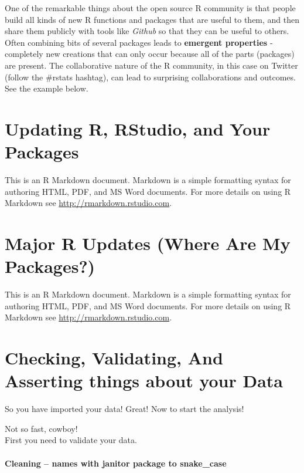 \documentclass[
]{book}
\begin{document}
One of the remarkable things about the open source R community is that people build all kinds of new R functions and packages that are useful to them, and then share them publicly with tools like \emph{Github} so that they can be useful to others. Often combining bits of several packages leads to \textbf{emergent properties} - completely new creations that can only occur because all of the parts (packages) are present. The collaborative nature of the R community, in this case on Twitter (follow the \#rstats hashtag), can lead to surprising collaborations and outcomes.\\
See the example below.\\

\hypertarget{updating-r-rstudio-and-your-packages}{%
\chapter{Updating R, RStudio, and Your Packages}\label{updating-r-rstudio-and-your-packages}}

This is an R Markdown document. Markdown is a simple formatting syntax for authoring HTML, PDF, and MS Word documents. For more details on using R Markdown see \url{http://rmarkdown.rstudio.com}.

\hypertarget{major-r-updates-where-are-my-packages}{%
\chapter{Major R Updates (Where Are My Packages?)}\label{major-r-updates-where-are-my-packages}}

This is an R Markdown document. Markdown is a simple formatting syntax for authoring HTML, PDF, and MS Word documents. For more details on using R Markdown see \url{http://rmarkdown.rstudio.com}.

\hypertarget{checking-validating-and-asserting-things-about-your-data}{%
\chapter{Checking, Validating, And Asserting things about your Data}\label{checking-validating-and-asserting-things-about-your-data}}

So you have imported your data!
Great!
Now to start the analysis!

Not so fast, cowboy!\\
First you need to validate your data.

\hypertarget{cleaning-names-with-janitor-package-to-snake_case}{%
\subsubsection{Cleaning -- names with janitor package to snake\_case}\label{cleaning-names-with-janitor-package-to-snake_case}}
\end{document}
